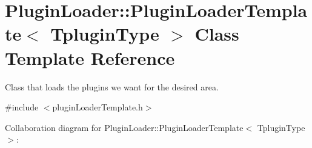 \hypertarget{classPluginLoader_1_1PluginLoaderTemplate}{}\section{Plugin\+Loader\+::Plugin\+Loader\+Template$<$ Tplugin\+Type $>$ Class Template Reference}
\label{classPluginLoader_1_1PluginLoaderTemplate}


Class that loads the plugins we want for the desired area.  




{\ttfamily \#include $<$plugin\+Loader\+Template.\+h$>$}



Collaboration diagram for Plugin\+Loader\+::Plugin\+Loader\+Template$<$ Tplugin\+Type $>$\+:
